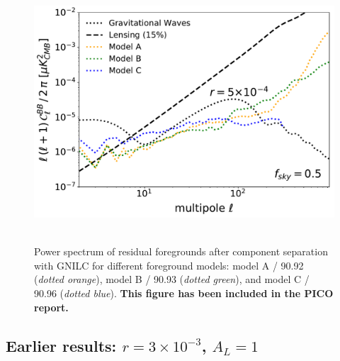 \documentclass[12pt]{article}
\begin{document}
\begin{figure}
  \begin{center}
    \includegraphics[width=0.5\columnwidth]{figures_memo/gnilc_pico_allmodels_r0_AL0p15_mc_test3_final.pdf}~
   \end{center}
\caption{Power spectrum of residual foregrounds after component separation with GNILC for different foreground models: model A / 90.92 (\emph{dotted orange}),  model B / 90.93 (\emph{dotted green}), and model C / 90.96 (\emph{dotted blue}). {\bf This figure has been included in the PICO report.}}
\label{Fig:gnilc_ps_residuals_all_models}
\end{figure}

\subsection{Earlier results: $r=3\times 10^{-3}$, $A_L=1$}
\end{document}
